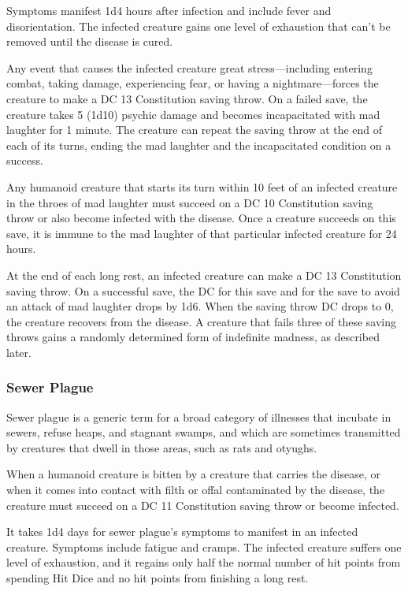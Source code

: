\documentclass[
]{article}
\begin{document}
Symptoms manifest 1d4 hours after infection and include fever and
disorientation. The infected creature gains one level of exhaustion that
can't be removed until the disease is cured.

Any event that causes the infected creature great stress---including
entering combat, taking damage, experiencing fear, or having a
nightmare---forces the creature to make a DC 13 Constitution saving
throw. On a failed save, the creature takes 5 (1d10) psychic damage and
becomes incapacitated with mad laughter for 1 minute. The creature can
repeat the saving throw at the end of each of its turns, ending the mad
laughter and the incapacitated condition on a success.

Any humanoid creature that starts its turn within 10 feet of an infected
creature in the throes of mad laughter must succeed on a DC 10
Constitution saving throw or also become infected with the disease. Once
a creature succeeds on this save, it is immune to the mad laughter of
that particular infected creature for 24 hours.

At the end of each long rest, an infected creature can make a DC 13
Constitution saving throw. On a successful save, the DC for this save
and for the save to avoid an attack of mad laughter drops by 1d6. When
the saving throw DC drops to 0, the creature recovers from the disease.
A creature that fails three of these saving throws gains a randomly
determined form of indefinite madness, as described later.

\hypertarget{sewer-plague}{%
\subsubsection{Sewer Plague}\label{sewer-plague}}

Sewer plague is a generic term for a broad category of illnesses that
incubate in sewers, refuse heaps, and stagnant swamps, and which are
sometimes transmitted by creatures that dwell in those areas, such as
rats and otyughs.

When a humanoid creature is bitten by a creature that carries the
disease, or when it comes into contact with filth or offal contaminated
by the disease, the creature must succeed on a DC 11 Constitution saving
throw or become infected.

It takes 1d4 days for sewer plague's symptoms to manifest in an infected
creature. Symptoms include fatigue and cramps. The infected creature
suffers one level of exhaustion, and it regains only half the normal
number of hit points from spending Hit Dice and no hit points from
finishing a long rest.
\end{document}

